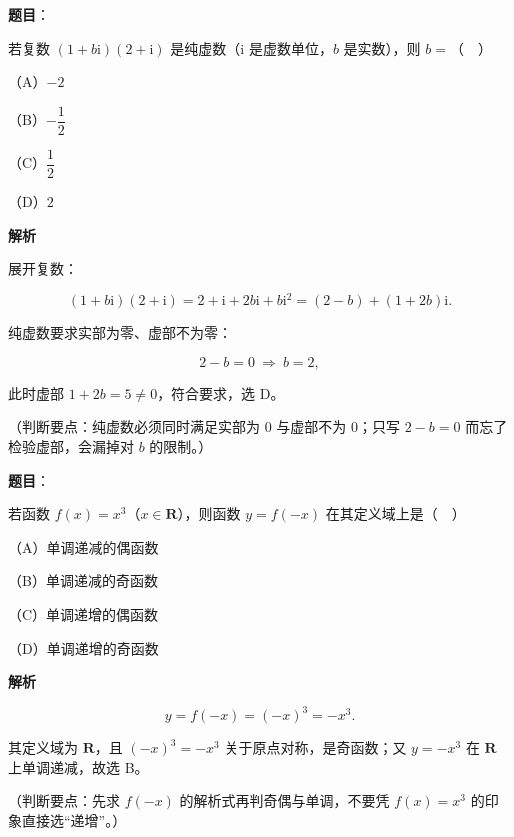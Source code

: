 \begin{answer}

\textbf{题目}：

若复数 $(1+b\mathrm i)(2+\mathrm i)$ 是纯虚数（$\mathrm i$ 是虚数单位，$b$ 是实数），则 $b=$（　）

（A）$-2$

（B）$-\dfrac12$

（C）$\dfrac12$

（D）$2$

\textbf{解析}

展开复数：

\nopagebreak[4]
\[(1+b\mathrm i)(2+\mathrm i)=2+\mathrm i+2b\mathrm i+b\mathrm i^2=(2-b)+(1+2b)\mathrm i.\]

纯虚数要求实部为零、虚部不为零：

\nopagebreak[4]
\[2-b=0\ \Rightarrow\ b=2,\]

此时虚部 $1+2b=5\neq0$，符合要求，选 D。

（判断要点：纯虚数必须同时满足实部为 $0$ 与虚部不为 $0$；只写 $2-b=0$ 而忘了检验虚部，会漏掉对 $b$ 的限制。）


\end{answer}
\begin{answer}

\textbf{题目}：

若函数 $f(x)=x^3$（$x\in\mathbf R$），则函数 $y=f(-x)$ 在其定义域上是（　）

（A）单调递减的偶函数

（B）单调递减的奇函数

（C）单调递增的偶函数

（D）单调递增的奇函数

\textbf{解析}

\nopagebreak[4]
\[y=f(-x)=(-x)^3=-x^3.\]

其定义域为 $\mathbf R$，且 $(-x)^3=-x^3$ 关于原点对称，是奇函数；又 $y=-x^3$ 在 $\mathbf R$ 上单调递减，故选 B。

（判断要点：先求 $f(-x)$ 的解析式再判奇偶与单调，不要凭 $f(x)=x^3$ 的印象直接选“递增”。）


\end{answer}
